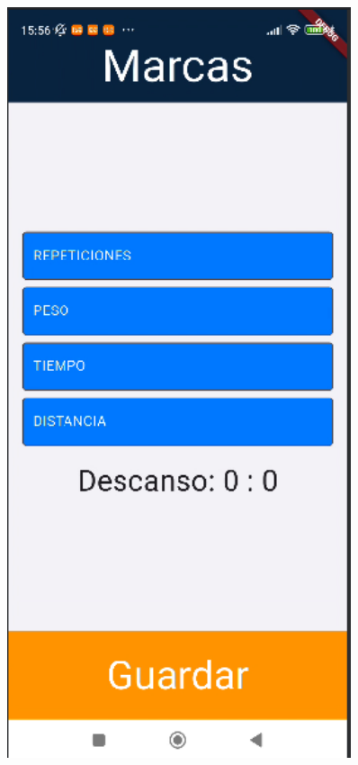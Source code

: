 \begin{figure}[H]
\begin{minipage}{0.4\textwidth}
      \label{fig:entrenando}
   \end{minipage}
   \hspace{0.5cm}
   \begin{minipage}{0.4\textwidth}
      \centering
      \includegraphics[width=0.9\textwidth]{pantallas/guardarMarc.png}

\end{minipage}
\end{figure}
